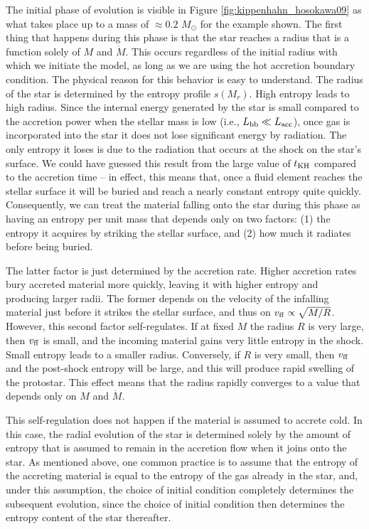 The initial phase of evolution is visible in Figure \ref{fig:kippenhahn_hosokawa09} as what takes place up to a mass of $\approx 0.2$ $M_\odot$ for the example shown. The first thing that happens during this phase is that the star reaches a radius that is a function solely of $M$ and $\dot{M}$. This occurs regardless of the initial radius with which we initiate the model, as long as we are using the hot accretion boundary condition. The physical reason for this behavior is easy to understand. The radius of the star is determined by the entropy profile $s(M_r)$. High entropy leads to high radius. Since the internal energy generated by the star is small compared to the accretion power when the stellar mass is low (i.e., $L_{\rm bb} \ll L_{\rm acc}$), once gas is incorporated into the star it does not lose significant energy by radiation. The only entropy it loses is due to the radiation that occurs at the shock on the star's surface. We could have guessed this result from the large value of $t_{\rm KH}$ compared to the accretion time -- in effect, this means that, once a fluid element reaches the stellar surface it will be buried and reach a nearly constant entropy quite quickly. Consequently, we can treat the material falling onto the star during this phase as having an entropy per unit mass that depends only on two factors: (1) the entropy it acquires by striking the stellar surface, and (2) how much it radiates before being buried.

The latter factor is just determined by the accretion rate. Higher accretion rates bury accreted material more quickly, leaving it with higher entropy and producing larger radii. The former depends on the velocity of the infalling material just before it strikes the stellar surface, and thus on $v_{\rm ff}\propto \sqrt{M/R}$. However, this second factor self-regulates. If at fixed $M$ the radius $R$ is very large, then $v_{\rm ff}$ is small, and the incoming material gains very little entropy in the shock. Small entropy leads to a smaller radius. Conversely, if $R$ is very small, then $v_{\rm ff}$ and the post-shock entropy will be large, and this will produce rapid swelling of the protostar. This effect means that the radius rapidly converges to a value that depends only on $M$ and $\dot{M}$.

This self-regulation does not happen if the material is assumed to accrete cold. In this case, the radial evolution of the star is determined solely by the amount of entropy that is assumed to remain in the accretion flow when it joins onto the star. As mentioned above, one common practice is to assume that the entropy of the accreting material is equal to the entropy of the gas already in the star, and, under this assumption, the choice of initial condition completely determines the subsequent evolution, since the choice of initial condition then determines the entropy content of the star thereafter.

